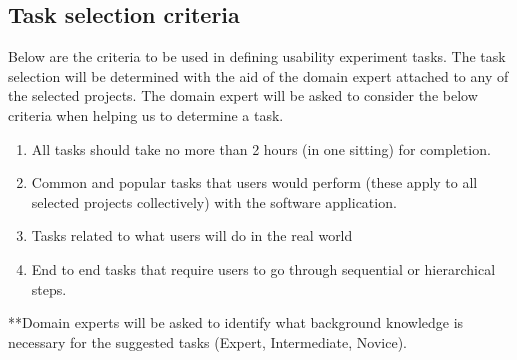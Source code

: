 \documentclass[letterpaper,cleveref]{lipics-v2019}
\theoremstyle{definition}
\begin{document}
\subsection{Task selection criteria}
Below are the criteria to be used in defining usability experiment tasks. The task selection will be determined with the aid of the domain expert attached to any of the selected projects. The domain expert will be asked to consider the below criteria when helping us to determine a task.
\begin {enumerate}
\item All tasks should take no more than 2 hours (in one sitting) for completion.
\item Common and popular tasks that users would perform (these apply to all selected projects collectively) with the software application.
\item Tasks related to what users will do in the real world
\item End to end tasks that require users to go through sequential or hierarchical steps.
\end {enumerate} 

**Domain experts will be asked to identify what background knowledge is necessary for the suggested tasks (Expert, Intermediate, Novice).
\end{document}
